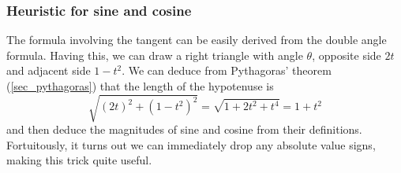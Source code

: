 \subsubsection{Heuristic for sine and cosine}


The formula involving the tangent can be easily derived from the double
angle formula. Having this, we can draw a right triangle with angle
\(\theta\), opposite side \(2t\) and adjacent side \(1 - t^2\). We can
deduce from Pythagoras' theorem (\ref{sec_pythagoras}) that the length of
the hypotenuse is
\begin{equation*}
\sqrt{(2t)^2 + (1 - t^2)^2} = \sqrt{1 + 2t^2 + t^4} = 1 + t^2
\end{equation*}
and then deduce the magnitudes of sine and cosine from their definitions.
Fortuitously, it turns out we can immediately drop any absolute value
signs, making this trick quite useful.
